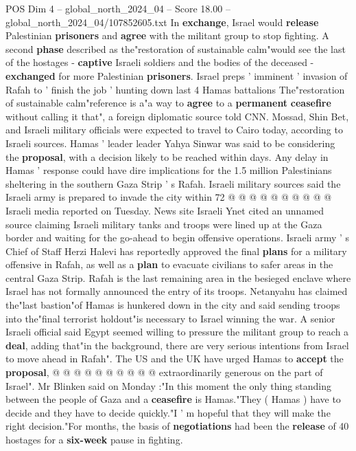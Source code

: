 \begin{textsample}{POS Dim 4 – global\_north\_2024\_04 – Score 18.00 – global\_north\_2024\_04/107852605.txt}  \label{ex:f4_pos_370}
In \textbf{exchange}, Israel would \textbf{release} Palestinian \textbf{prisoners} and \textbf{agree} with the militant group to stop fighting.
A second \textbf{phase} described as the"restoration of sustainable calm"would see the last of the hostages - \textbf{captive} Israeli soldiers and the bodies of the deceased - \textbf{exchanged} for more Palestinian \textbf{prisoners}.
Israel preps ' imminent ' invasion of Rafah to ' finish the job ' hunting down last 4 Hamas battalions The"restoration of sustainable calm"reference is a"a way to \textbf{agree} to a \textbf{permanent} \textbf{ceasefire} without calling it that", a foreign diplomatic source told CNN.
Mossad, Shin Bet, and Israeli military officials were expected to travel to Cairo today, according to Israeli sources.
Hamas ' leader leader Yahya Sinwar was said to be considering the \textbf{proposal}, with a decision likely to be reached within days.
Any delay in Hamas ' response could have dire implications for the 1.5 million Palestinians sheltering in the southern Gaza Strip ' s Rafah.
Israeli military sources said the Israeli army is prepared to invade the city within 72 @ @ @ @ @ @ @ @ @ @ Israeli media reported on Tuesday.
News site Israeli Ynet cited an unnamed source claiming Israeli military tanks and troops were lined up at the Gaza border and waiting for the go-ahead to begin offensive operations.
Israeli army ' s Chief of Staff Herzi Halevi has reportedly approved the final \textbf{plans} for a military offensive in Rafah, as well as a \textbf{plan} to evacuate civilians to safer areas in the central Gaza Strip.
Rafah is the last remaining area in the besieged enclave where Israel has not formally announced the entry of its troops.
Netanyahu has claimed the"last bastion"of Hamas is hunkered down in the city and said sending troops into the"final terrorist holdout"is necessary to Israel winning the war.
A senior Israeli official said Egypt seemed willing to pressure the militant group to reach a \textbf{deal}, adding that"in the background, there are very serious intentions from Israel to move ahead in Rafah".
The US and the UK have urged Hamas to \textbf{accept} the \textbf{proposal}, @ @ @ @ @ @ @ @ @ @ extraordinarily generous on the part of Israel".
Mr Blinken said on Monday :"In this moment the only thing standing between the people of Gaza and a \textbf{ceasefire} is Hamas."They ( Hamas ) have to decide and they have to decide quickly."I ' m hopeful that they will make the right decision."For months, the basis of \textbf{negotiations} had been the \textbf{release} of 40 hostages for a \textbf{six-week} pause in fighting.

\end{textsample}

